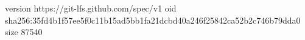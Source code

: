 version https://git-lfs.github.com/spec/v1
oid sha256:35fd4b1f57ee5f0c11b15ad5bb1fa21dcbd40a246f25842ca52b2c746b79dda0
size 87540
